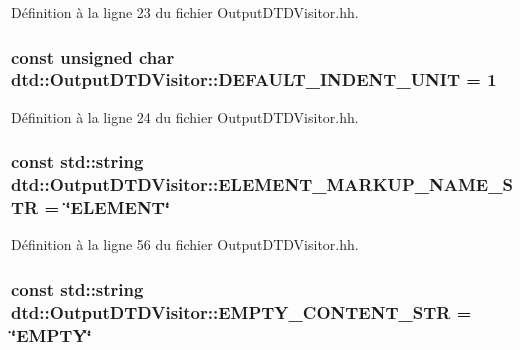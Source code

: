 Définition à la ligne 23 du fichier OutputDTDVisitor.hh.

\hypertarget{classdtd_1_1_output_d_t_d_visitor_a7795d56eeb6ab2e68c8d3a43e1c6f487}{
\subsubsection[{DEFAULT\_\-INDENT\_\-UNIT}]{\setlength{\rightskip}{0pt plus 5cm}const unsigned char {\bf dtd::OutputDTDVisitor::DEFAULT\_\-INDENT\_\-UNIT} = 1}}
\label{classdtd_1_1_output_d_t_d_visitor_a7795d56eeb6ab2e68c8d3a43e1c6f487}


Définition à la ligne 24 du fichier OutputDTDVisitor.hh.

\hypertarget{classdtd_1_1_output_d_t_d_visitor_a14cd0eb333af784f38e3441c8fd1b97d}{
\subsubsection[{ELEMENT\_\-MARKUP\_\-NAME\_\-STR}]{\setlength{\rightskip}{0pt plus 5cm}const std::string {\bf dtd::OutputDTDVisitor::ELEMENT\_\-MARKUP\_\-NAME\_\-STR} = \char`\"{}ELEMENT\char`\"{}}}
\label{classdtd_1_1_output_d_t_d_visitor_a14cd0eb333af784f38e3441c8fd1b97d}


Définition à la ligne 56 du fichier OutputDTDVisitor.hh.

\hypertarget{classdtd_1_1_output_d_t_d_visitor_af77ea7a3f4f05a3b3fea5a58a7d6de53}{
\subsubsection[{EMPTY\_\-CONTENT\_\-STR}]{\setlength{\rightskip}{0pt plus 5cm}const std::string {\bf dtd::OutputDTDVisitor::EMPTY\_\-CONTENT\_\-STR} = \char`\"{}EMPTY\char`\"{}}}
\label{classdtd_1_1_output_d_t_d_visitor_af77ea7a3f4f05a3b3fea5a58a7d6de53}



